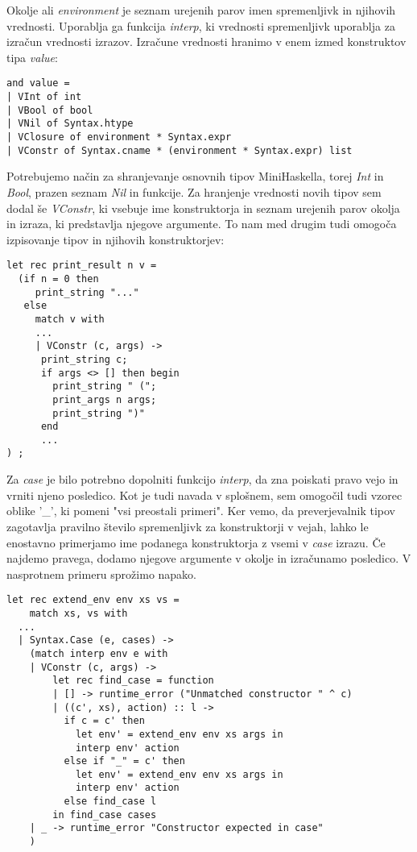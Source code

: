 \documentclass[12pt,a4paper,openany]{book}
\begin{document}
Okolje ali \emph{environment} je seznam urejenih parov imen spremenljivk in njihovih vrednosti. Uporablja ga funkcija \emph{interp}, ki vrednosti spremenljivk uporablja za izračun 
vrednosti izrazov. Izračune vrednosti hranimo v enem izmed konstruktov tipa \emph{value}: 
\begin{lstlisting}
and value =
| VInt of int
| VBool of bool
| VNil of Syntax.htype
| VClosure of environment * Syntax.expr
| VConstr of Syntax.cname * (environment * Syntax.expr) list
\end{lstlisting}
Potrebujemo način za shranjevanje osnovnih tipov MiniHaskella, torej \emph{Int} in \emph{Bool}, prazen seznam \emph{Nil} in funkcije. Za hranjenje vrednosti novih tipov sem dodal še 
\emph{VConstr}, ki vsebuje ime konstruktorja in seznam urejenih parov okolja in izraza, ki predstavlja njegove argumente. To nam med drugim tudi omogoča izpisovanje tipov in njihovih 
konstruktorjev:
\begin{lstlisting}
let rec print_result n v =
  (if n = 0 then
     print_string "..."
   else
     match v with
     ...
     | VConstr (c, args) ->
      print_string c;
      if args <> [] then begin
        print_string " (";
        print_args n args;
        print_string ")"
      end
      ...
) ;
\end{lstlisting}

Za \emph{case} je bilo potrebno dopolniti funkcijo \emph{interp}, da zna poiskati pravo vejo in vrniti njeno posledico. Kot je tudi navada v splošnem, sem omogočil tudi vzorec oblike '\_', ki 
pomeni "vsi preostali primeri". Ker vemo, da preverjevalnik tipov zagotavlja pravilno število spremenljivk za konstruktorji v vejah, lahko le enostavno primerjamo ime podanega 
konstruktorja z vsemi v \emph{case} izrazu. Če najdemo pravega, dodamo njegove argumente v okolje in izračunamo posledico. V nasprotnem primeru sprožimo napako. 
\begin{lstlisting}
let rec extend_env env xs vs =
    match xs, vs with
  ...
  | Syntax.Case (e, cases) ->
    (match interp env e with
    | VConstr (c, args) ->
        let rec find_case = function
        | [] -> runtime_error ("Unmatched constructor " ^ c)
        | ((c', xs), action) :: l ->
          if c = c' then
            let env' = extend_env env xs args in
            interp env' action
          else if "_" = c' then
            let env' = extend_env env xs args in
            interp env' action
          else find_case l
        in find_case cases
    | _ -> runtime_error "Constructor expected in case"
    )
\end{lstlisting}
\end{document}
